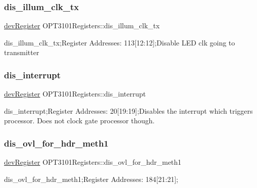 \subsubsection{\texorpdfstring{dis\+\_\+illum\+\_\+clk\+\_\+tx}{dis\_illum\_clk\_tx}}
{\footnotesize\ttfamily \mbox{\hyperlink{classdev_register}{dev\+Register}} O\+P\+T3101\+Registers\+::dis\+\_\+illum\+\_\+clk\+\_\+tx}



dis\+\_\+illum\+\_\+clk\+\_\+tx;Register Addresses\+: 113\mbox{[}12\+:12\mbox{]};Disable L\+ED clk going to transmitter 

\mbox{\label{class_o_p_t3101_registers_afdd0ffaec2b6589f500f059bb54c249e}} 
\subsubsection{\texorpdfstring{dis\+\_\+interrupt}{dis\_interrupt}}
{\footnotesize\ttfamily \mbox{\hyperlink{classdev_register}{dev\+Register}} O\+P\+T3101\+Registers\+::dis\+\_\+interrupt}



dis\+\_\+interrupt;Register Addresses\+: 20\mbox{[}19\+:19\mbox{]};Disables the interrupt which triggers processor. Does not clock gate processor though. 

\mbox{\label{class_o_p_t3101_registers_a9ab51119f9bf4af2ca08e61606899677}} 
\subsubsection{\texorpdfstring{dis\+\_\+ovl\+\_\+for\+\_\+hdr\+\_\+meth1}{dis\_ovl\_for\_hdr\_meth1}}
{\footnotesize\ttfamily \mbox{\hyperlink{classdev_register}{dev\+Register}} O\+P\+T3101\+Registers\+::dis\+\_\+ovl\+\_\+for\+\_\+hdr\+\_\+meth1}



dis\+\_\+ovl\+\_\+for\+\_\+hdr\+\_\+meth1;Register Addresses\+: 184\mbox{[}21\+:21\mbox{]}; 

